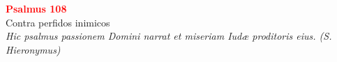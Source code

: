 


\def\greinitialformat#1{%
{\fontsize{39}{39}\selectfont #1}%
}




\vspace{0.3cm}
\begin{center}
 \textcolor{red}{\large \bf Psalmus 108}\\
Contra perfidos inimicos\\
\textit{\small Hic psalmus passionem Domini narrat et miseriam Iudæ proditoris eius. (S. Hieronymus)}
\end{center}
